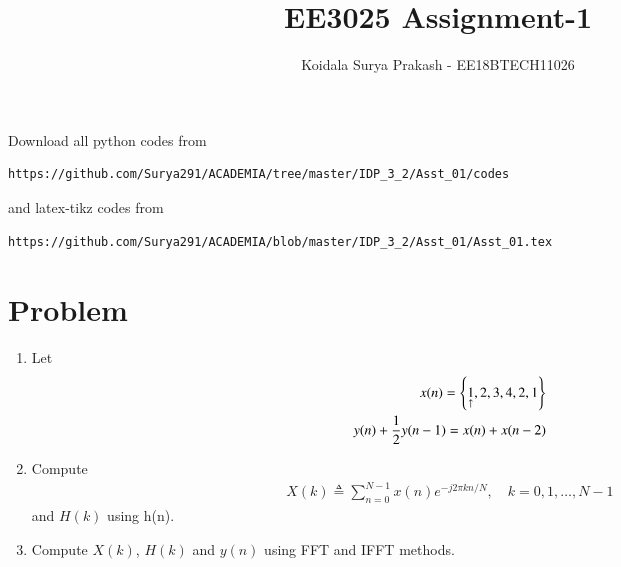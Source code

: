 \documentclass[journal,12pt,twocolumn]{IEEEtran}
\renewcommand\thesection{\arabic{section}}
\begin{document}
     \def\rightbox#1{\makebox[0in][r]{#1}}
     \def\centbox#1{\makebox[0in]{#1}}
     \def\topbox#1{\raisebox{-\baselineskip}[0in][0in]{#1}}
     \def\midbox#1{\raisebox{-0.5\baselineskip}[0in][0in]{#1}}
\vspace{3cm}
\title{EE3025 Assignment-1}
\author{Koidala Surya Prakash - EE18BTECH11026}
\maketitle
\newpage
\bigskip
\renewcommand{\thefigure}{\theenumi}
\renewcommand{\thetable}{\theenumi}
Download all python codes from 
\begin{lstlisting}
https://github.com/Surya291/ACADEMIA/tree/master/IDP_3_2/Asst_01/codes

\end{lstlisting}
%
and latex-tikz codes from 
%
\begin{lstlisting}
https://github.com/Surya291/ACADEMIA/blob/master/IDP_3_2/Asst_01/Asst_01.tex
\end{lstlisting}


\section{Problem}
\begin{enumerate}[label=\thesection.\arabic*.,ref=\thesection.\theenumi]
    
    \item Let
    \begin{align}
        x(n) = \cbrak{\underset{\uparrow}{1},2,3,4,2,1}
         \label{eq:equation0}\\
        y(n) + \frac{1}{2}y(n-1) = x(n) + x(n-2)	
        \label{eq:equation1}
    \end{align}
    
    \item Compute 
    \begin{align}
        X(k) \triangleq \sum_{n=0}^{N-1} x(n) e^{-j 2 \pi k n / N}, \quad k=0,1, \ldots, N-1
    \end{align}
    and $H(k)$ using h(n).
    
    \item Compute $X(k)$, $H(k)$ and $y(n)$ using FFT and IFFT methods.
\end{enumerate}
\end{document}

